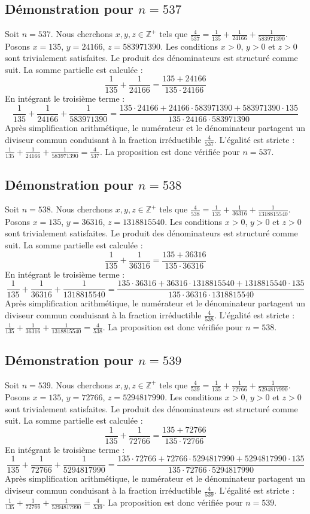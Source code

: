 \documentclass[11pt,a4paper]{article}
\begin{document}
\subsection{Démonstration pour $n = 537$}
Soit $n = 537$. Nous cherchons $x, y, z \in \mathbb{Z}^{+}$ tels que $\frac{4}{537} = \frac{1}{135} + \frac{1}{24166} + \frac{1}{583971390}$.
Posons $x = 135$, $y = 24166$, $z = 583971390$.
Les conditions $x > 0$, $y > 0$ et $z > 0$ sont trivialement satisfaites.
Le produit des dénominateurs est structuré comme suit. La somme partielle est calculée :
$$ \frac{1}{135} + \frac{1}{24166} = \frac{135+24166}{135 \cdot 24166} $$
En intégrant le troisième terme :
$$ \frac{1}{135} + \frac{1}{24166} + \frac{1}{583971390} = \frac{135 \cdot 24166 + 24166 \cdot 583971390 + 583971390 \cdot 135}{135 \cdot 24166 \cdot 583971390} $$
Après simplification arithmétique, le numérateur et le dénominateur partagent un diviseur commun conduisant à la fraction irréductible $\frac{4}{537}$.
L'égalité est stricte : $\frac{1}{135} + \frac{1}{24166} + \frac{1}{583971390} = \frac{4}{537}$.
La proposition est donc vérifiée pour $n = 537$.
\subsection{Démonstration pour $n = 538$}
Soit $n = 538$. Nous cherchons $x, y, z \in \mathbb{Z}^{+}$ tels que $\frac{4}{538} = \frac{1}{135} + \frac{1}{36316} + \frac{1}{1318815540}$.
Posons $x = 135$, $y = 36316$, $z = 1318815540$.
Les conditions $x > 0$, $y > 0$ et $z > 0$ sont trivialement satisfaites.
Le produit des dénominateurs est structuré comme suit. La somme partielle est calculée :
$$ \frac{1}{135} + \frac{1}{36316} = \frac{135+36316}{135 \cdot 36316} $$
En intégrant le troisième terme :
$$ \frac{1}{135} + \frac{1}{36316} + \frac{1}{1318815540} = \frac{135 \cdot 36316 + 36316 \cdot 1318815540 + 1318815540 \cdot 135}{135 \cdot 36316 \cdot 1318815540} $$
Après simplification arithmétique, le numérateur et le dénominateur partagent un diviseur commun conduisant à la fraction irréductible $\frac{4}{538}$.
L'égalité est stricte : $\frac{1}{135} + \frac{1}{36316} + \frac{1}{1318815540} = \frac{4}{538}$.
La proposition est donc vérifiée pour $n = 538$.
\subsection{Démonstration pour $n = 539$}
Soit $n = 539$. Nous cherchons $x, y, z \in \mathbb{Z}^{+}$ tels que $\frac{4}{539} = \frac{1}{135} + \frac{1}{72766} + \frac{1}{5294817990}$.
Posons $x = 135$, $y = 72766$, $z = 5294817990$.
Les conditions $x > 0$, $y > 0$ et $z > 0$ sont trivialement satisfaites.
Le produit des dénominateurs est structuré comme suit. La somme partielle est calculée :
$$ \frac{1}{135} + \frac{1}{72766} = \frac{135+72766}{135 \cdot 72766} $$
En intégrant le troisième terme :
$$ \frac{1}{135} + \frac{1}{72766} + \frac{1}{5294817990} = \frac{135 \cdot 72766 + 72766 \cdot 5294817990 + 5294817990 \cdot 135}{135 \cdot 72766 \cdot 5294817990} $$
Après simplification arithmétique, le numérateur et le dénominateur partagent un diviseur commun conduisant à la fraction irréductible $\frac{4}{539}$.
L'égalité est stricte : $\frac{1}{135} + \frac{1}{72766} + \frac{1}{5294817990} = \frac{4}{539}$.
La proposition est donc vérifiée pour $n = 539$.
\end{document}
